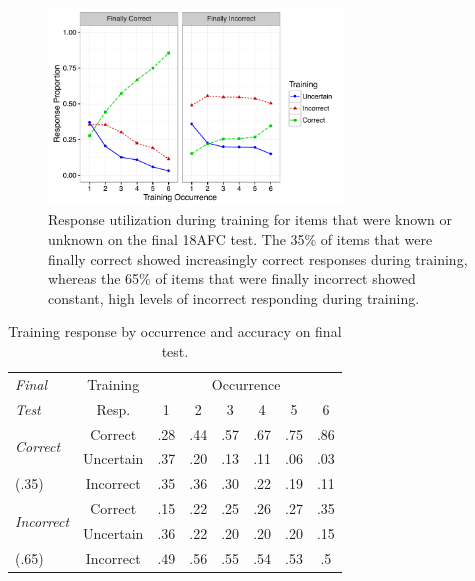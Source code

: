 \documentclass[man,floatsintext]{apa6}
\begin{document}
\begin{figure}[h]
  \centering
  \includegraphics[width=0.7\textwidth]{human_training_responses_by_final_acc}
  \caption{Response utilization during training for items that were known or unknown on the final 18AFC test. The 35\% of items that were finally correct showed increasingly correct responses during training, whereas the 65\% of items that were finally incorrect showed constant, high levels of incorrect responding during training.}
  \label{fig:train_by_final_acc}
\end{figure} 


\begin{table}[ht] 
\begin{center}
\caption{Training response by occurrence and accuracy on final test.} 
\label{tab:train_acc} 
\vskip 0.05in
\begin{tabular}{l | c | c  c c c c c}
\hline
{\em Final} & Training & \multicolumn{6}{c}{Occurrence} \\
{\em Test} & Resp. &   1   &  2  &  3  &  4  &  5  &  6 \\
\hline
\multirow{2}{*}{{\em Correct}} & Correct & .28 & .44 & .57 & .67 & .75 & .86 \\
				 	  & Uncertain & .37 & .20 & .13 & .11 & .06 & .03 \\
				(.35)	   & Incorrect  & .35 & .36 & .30 & .22 & .19 & .11 \\
\hline
\multirow{2}{*}{{\em Incorrect}} & Correct & .15 & .22 & .25 & .26 & .27 & .35 \\
				     	& Uncertain & .36 & .22 & .20 & .20 & .20 & .15 \\
				(.65)     & Incorrect  & .49 & .56 & .55 & .54 & .53 & .5 \\
\hline
\end{tabular} 
\end{center}
\end{table}
\end{document}
